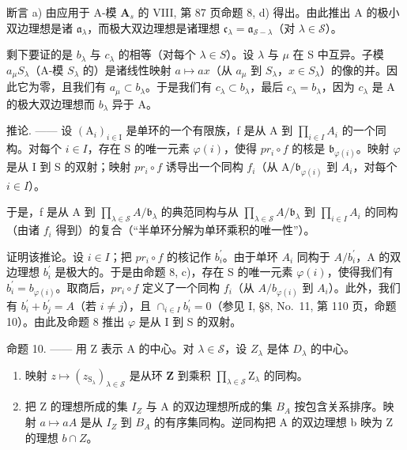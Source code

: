 断言 a) 由应用于 A-模 \(\mathbf{A}_s\) 的 VIII, 第 87 页命题 8, d) 得出。由此推出 A 的极小双边理想是诸 \(\mathfrak{a}_{\lambda}\)，而极大双边理想是诸理想 \(\mathfrak{c}_{\lambda} = \mathfrak{a}_{\mathcal{S} - \lambda}\)（对 \(\lambda \in \mathcal{S}\)）。

剩下要证的是 \(b_{\lambda}\) 与 \(c_{\lambda}\) 的相等（对每个 \(\lambda \in S\)）。设 \(\lambda\) 与 \(\mu\) 在 S 中互异。子模 \(a_{\mu}S_{\lambda}\)（A-模 \(S_{\lambda}\) 的）是诸线性映射 \(a \mapsto ax\)（从 \(a_{\mu}\) 到 \(S_{\lambda}\)，\(x \in S_{\lambda}\)）的像的并。因此它为零，且我们有 \(a_{\mu} \subset b_{\lambda}\)。于是我们有 \(c_{\lambda} \subset b_{\lambda}\)，最后 \(c_{\lambda} = b_{\lambda}\)，因为 \(c_{\lambda}\) 是 A 的极大双边理想而 \(b_{\lambda}\) 异于 A。

推论. —— 设 \((\mathrm{A}_{i})_{i\in\mathrm{I}}\) 是单环的一个有限族，f 是从 A 到 \(\prod_{i\in I}A_{i}\) 的一个同构。对每个 \(i\in I\)，存在 S 的唯一元素 \(\varphi(i)\)，使得 \(pr_{i}\circ f\) 的核是 \(\mathfrak{b}_{\varphi(i)}\)。映射 \(\varphi\) 是从 I 到 S 的双射；映射 \(pr_{i}\circ f\) 诱导出一个同构 \(f_{i}\)（从 \(\mathrm{A}/\mathfrak{b}_{\varphi(i)}\) 到 \(A_{i}\)，对每个 \(i\in I\)）。

于是，f 是从 A 到 \(\prod_{\lambda\in\mathscr{S}}A/\mathfrak{b}_{\lambda}\) 的典范同构与从 \(\prod_{\lambda\in\mathscr{S}}A/\mathfrak{b}_{\lambda}\) 到 \(\prod_{i\in I}A_{i}\) 的同构（由诸 \(f_{i}\) 得到）的复合（“半单环分解为单环乘积的唯一性”）。

证明该推论。设 \(i \in I\)；把 \(pr_{i} \circ f\) 的核记作 \(b_{i}^{\prime}\)。由于单环 \(A_{i}\) 同构于 \(A/b_{i}^{\prime}\)，A 的双边理想 \(b_{i}^{\prime}\) 是极大的。于是由命题 8, c)，存在 S 的唯一元素 \(\varphi(i)\)，使得我们有 \(b_{i}^{\prime} = b_{\varphi(i)}\)。取商后，\(pr_{i} \circ f\) 定义了一个同构 \(f_{i}\)（从 \(A/b_{\varphi(i)}\) 到 \(A_{i}\)）。此外，我们有 \(b_{i}^{\prime} + b_{j}^{\prime} = A\)（若 \(i \neq j\)），且 \(\cap_{i \in I} b_{i}^{\prime} = 0\)（参见 I, §8, No.~11, 第 110 页，命题 10）。由此及命题 8 推出 \(\varphi\) 是从 I 到 S 的双射。

命题 10. —— 用 Z 表示 A 的中心。对 \(\lambda \in \mathcal{S}\)，设 \(Z_{\lambda}\) 是体 \(D_{\lambda}\) 的中心。

\begin{enumerate}
\def\labelenumi{\alph{enumi})}
\item
  映射 \(z \mapsto (z_{\mathrm{S}_{\lambda}})_{\lambda \in \mathcal{S}}\) 是从环 \(\mathbf{Z}\) 到乘积 \(\prod_{\lambda \in \mathcal{S}}\mathrm{Z}_{\lambda}\) 的同构。
\item
  把 Z 的理想所成的集 \(I_{Z}\) 与 A 的双边理想所成的集 \(B_{A}\) 按包含关系排序。映射 \(a \mapsto aA\) 是从 \(I_{Z}\) 到 \(B_{A}\) 的有序集同构。逆同构把 A 的双边理想 b 映为 Z 的理想 \(b \cap Z\)。
\end{enumerate}

